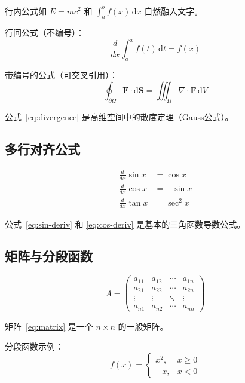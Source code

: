 \documentclass{harryopo-mathnotes}
\begin{document}
行内公式如 $E=mc^2$ 和 $\int_a^b f(x)\,\mathrm{d}x$ 自然融入文字。

行间公式（不编号）：
$$ \frac{d}{dx}\int_a^x f(t)\,\mathrm{d}t = f(x) $$

带编号的公式（可交叉引用）：
\begin{equation}
  \oint_{\partial\Omega} \mathbf{F}\cdot\mathrm{d}\mathbf{S}
  = \iiint_\Omega \nabla\cdot\mathbf{F}\,\mathrm{d}V
  \label{eq:divergence}
\end{equation}

公式~\eqref{eq:divergence} 是高维空间中的散度定理（Gauss公式）。

\subsection{多行对齐公式}

\begin{align}
  \frac{d}{dx}\sin x    &= \cos x \label{eq:sin-deriv} \\
  \frac{d}{dx}\cos x    &= -\sin x \label{eq:cos-deriv} \\
  \frac{d}{dx}\tan x    &= \sec^2 x
\end{align}

公式~\eqref{eq:sin-deriv} 和 \eqref{eq:cos-deriv} 是基本的三角函数导数公式。

\subsection{矩阵与分段函数}

\begin{equation}
  A = \begin{pmatrix}
    a_{11} & a_{12} & \cdots & a_{1n} \\
    a_{21} & a_{22} & \cdots & a_{2n} \\
    \vdots & \vdots & \ddots & \vdots \\
    a_{n1} & a_{n2} & \cdots & a_{nn}
  \end{pmatrix}
  \label{eq:matrix}
\end{equation}

矩阵~\eqref{eq:matrix} 是一个 $n\times n$ 的一般矩阵。

分段函数示例：
$$ f(x) = \begin{cases}
  x^2,                 & x \geq 0 \\
  -x,                  & x < 0
\end{cases} $$

\end{document}

